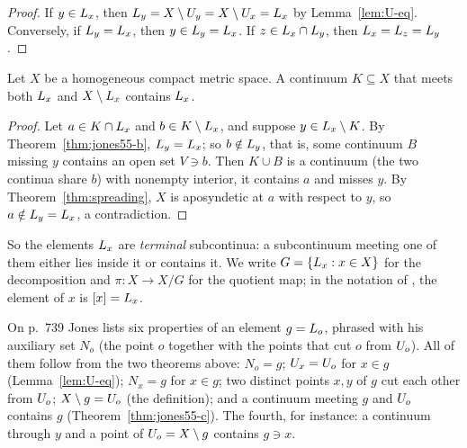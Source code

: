 \begin{proof}
If $y\in L_{x}$, then $L_{y}=X\setminus U_{y}=X\setminus U_{x}=L_{x}$ by Lemma~\ref{lem:U-eq}. Conversely, if
$L_{y}=L_{x}$, then $y\in L_{y}=L_{x}$. If $z\in L_{x}\cap L_{y}$, then $L_{x}=L_{z}=L_{y}$.
\end{proof}


\begin{theorem}\label{thm:jones55-c}
Let $X$ be a homogeneous compact metric space. A continuum $K\subseteq X$ that meets both $L_{x}$ and
$X\setminus L_{x}$ contains $L_{x}$.
\end{theorem}

\begin{proof}
Let $a\in K\cap L_{x}$ and $b\in K\setminus L_{x}$, and suppose $y\in L_{x}\setminus K$. By Theorem~\ref{thm:jones55-b},
$L_{y}=L_{x}$; so $b\notin L_{y}$, that is, some continuum $B$ missing $y$ contains an open set $V\ni b$. Then $K\cup B$
is a continuum (the two continua share $b$) with nonempty interior, it contains $a$ and misses $y$. By
Theorem~\ref{thm:spreading}, $X$ is aposyndetic at $a$ with respect to $y$, so $a\notin L_{y}=L_{x}$, a
contradiction.
\end{proof}


So the elements $L_{x}$ are \emph{terminal} subcontinua: a subcontinuum meeting one of them either lies inside
it or contains it. We write $G=\left\{ L_{x} : x\in X \right\}$ for the decomposition and $\pi\colon X\to X/G$ for the
quotient map; in the notation of , the element of $x$ is $[x]=L_{x}$.


\begin{remark}\label{rem:props}
On p.~739 Jones lists six properties of an element $g=L_{o}$, phrased with his auxiliary set $N_o$ (the point $o$
together with the points that cut $o$ from $U_{o}$). All of them follow from the two theorems above:
$N_o=g$; $U_{x}=U_{o}$ for $x\in g$ (Lemma~\ref{lem:U-eq}); $N_x=g$ for $x\in g$; two distinct points $x,y$ of $g$ cut
each other from $U_{o}$; $X\setminus g=U_{o}$ (the definition); and a continuum meeting $g$ and $U_{o}$ contains $g$
(Theorem~\ref{thm:jones55-c}). The fourth, for instance: a continuum through $y$ and a point of $U_{o}=X\setminus g$
contains $g\ni x$.
\end{remark}

